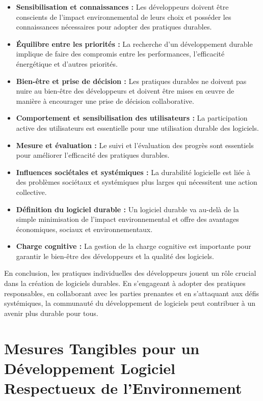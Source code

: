 \begin{itemize}
    \item \textbf{Sensibilisation et connaissances :} Les développeurs doivent être conscients de l'impact environnemental de leurs choix et posséder les connaissances nécessaires pour adopter des pratiques durables.
    \item \textbf{Équilibre entre les priorités :} La recherche d'un développement durable implique de faire des compromis entre les performances, l'efficacité énergétique et d'autres priorités.
    \item \textbf{Bien-être et prise de décision :} Les pratiques durables ne doivent pas nuire au bien-être des développeurs et doivent être mises en œuvre de manière à encourager une prise de décision collaborative.
    \item \textbf{Comportement et sensibilisation des utilisateurs :} La participation active des utilisateurs est essentielle pour une utilisation durable des logiciels.
    \item \textbf{Mesure et évaluation :} Le suivi et l'évaluation des progrès sont essentiels pour améliorer l'efficacité des pratiques durables.
    \item \textbf{Influences sociétales et systémiques :} La durabilité logicielle est liée à des problèmes sociétaux et systémiques plus larges qui nécessitent une action collective.
    \item \textbf{Définition du logiciel durable :} Un logiciel durable va au-delà de la simple minimisation de l'impact environnemental et offre des avantages économiques, sociaux et environnementaux.
    \item \textbf{Charge cognitive :} La gestion de la charge cognitive est importante pour garantir le bien-être des développeurs et la qualité des logiciels.
\end{itemize}


En conclusion, les pratiques individuelles des développeurs jouent un rôle crucial dans la création de logiciels durables. En s'engageant à adopter des pratiques responsables, en collaborant avec les parties prenantes et en s'attaquant aux défis systémiques, la communauté du développement de logiciels peut contribuer à un avenir plus durable pour tous.


\section{Mesures Tangibles pour un Développement Logiciel Respectueux de l'Environnement}
\label{sec:mesure-amelioration}

